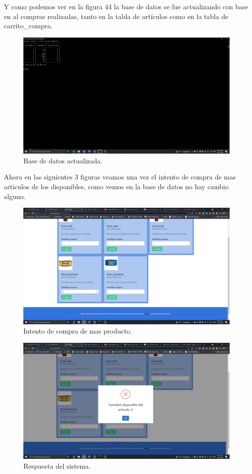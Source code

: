 \documentclass[11pt]{article}
\begin{document}
		Y como podemos ver en la figura 44 la base de datos se fue actualizando con base en al compras realizadas, tanto en la tabla de artículos como en la tabla de carrito\_compra.
		\begin{figure}[H]
			\centering
			\includegraphics[scale=0.34]{resources/bdp3.1.png}
			\caption{Base de datos actualizada.}\label{fig:picture}
		\end{figure}
		Ahora en las siguientes 3 figuras veamos una vez el intento de compra de mas articulos de los disponibles, como vemos en la base de datos no hay cambio alguno.
		\begin{figure}[H]
			\centering
			\includegraphics[scale=0.34]{resources/p3mas.png}
			\caption{Intento de compra de mas producto.}\label{fig:picture}
		\end{figure}
		\begin{figure}[H]
			\centering
			\includegraphics[scale=0.34]{resources/p3mas1.png}
			\caption{Respuesta del sistema.}\label{fig:picture}
		\end{figure}
\end{document}
